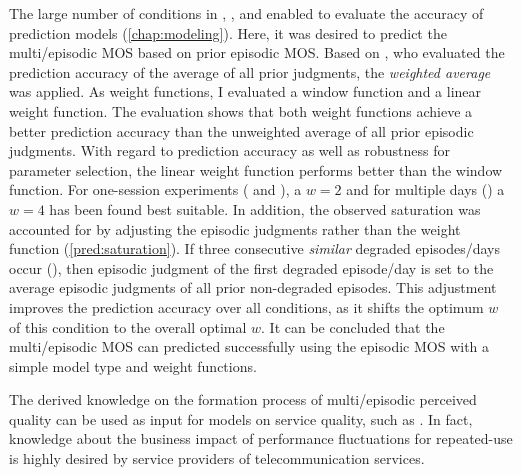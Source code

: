 The large number of conditions in , \EIIa{}, and  enabled to evaluate the accuracy of prediction models (\autoref{chap:modeling}).
Here, it was desired to predict the multi\-/episodic \ac{MOS} based on prior episodic \ac{MOS}.
Based on \citet{moller_single-call_2011}, who evaluated the prediction accuracy of the average of all prior judgments, the \emph{weighted average} was applied.
As weight functions, I evaluated a window function and a linear weight function.
The evaluation shows that both weight functions achieve a better prediction accuracy than the unweighted average of all prior episodic judgments.
With regard to prediction accuracy as well as robustness for parameter selection, the linear weight function performs better than the window function.
For one-session experiments ( and \EIIa{}), a $\mathit{w}=2$ and for multiple days () a $\mathit{w}=4$ has been found best suitable.
In addition, the observed saturation was accounted for by adjusting the episodic judgments rather than the weight function (\autoref{pred:saturation}).
If three consecutive \emph{similar} degraded episodes/days occur (), then episodic judgment of the first degraded episode/day is set to the average episodic judgments of all prior non-degraded episodes.
This adjustment improves the prediction accuracy over all conditions, as it shifts the optimum $\mathit{w}$ of this condition to the overall optimal $\mathit{w}$.
It can be concluded that the multi\-/episodic \ac{MOS} can predicted successfully using the episodic \ac{MOS} with a simple model type and weight functions.

The derived knowledge on the formation process of multi\-/episodic perceived quality can be used as input for models on service quality, such as \citet{parasuraman_conceptual_1985}.
In fact, knowledge about the business impact of performance fluctuations for repeated-use is highly desired by service providers of telecommunication services.

